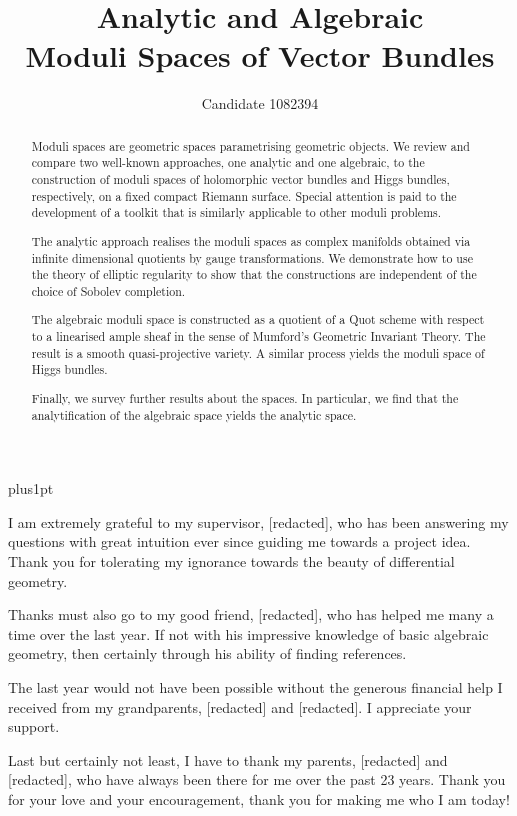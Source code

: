 \documentclass[12pt]{ociamthesis}  %
\title{Analytic and Algebraic\\[1ex]Moduli Spaces of Vector Bundles}   %
\author{Candidate 1082394}             %
\begin{document}
\baselineskip=18pt plus1pt

\setcounter{secnumdepth}{3}
\setcounter{tocdepth}{3}


\maketitle                  %

\begin{acknowledgements}
  I am extremely grateful to my supervisor, [redacted],
  who has been answering my questions with great intuition ever since
  guiding me towards a project idea. Thank you for tolerating my
  ignorance towards the beauty of differential geometry.

  Thanks must also go to my good friend, [redacted], who has
  helped me many a time over the last year. If not with his
  impressive knowledge of basic algebraic geometry, then certainly
  through his ability of finding references.

  The last year would not have been possible without the generous
  financial help I received from my grandparents, [redacted] and
  [redacted].  I appreciate your support.

  Last but certainly not least, I have to thank my parents,
  [redacted] and [redacted], who have always been there for
  me over the past 23 years. Thank you for your love and your
  encouragement, thank you for making me who I am today!
\end{acknowledgements}

\begin{abstract}
  Moduli spaces are geometric spaces parametrising geometric objects.  We review
  and compare two well-known approaches, one analytic and one algebraic, to the
  construction of moduli spaces of holomorphic vector bundles and Higgs bundles,
  respectively, on a fixed compact Riemann surface. Special attention
  is paid to the development of a toolkit that is similarly applicable to
  other moduli problems.

  The analytic approach realises the moduli spaces as complex
  manifolds obtained via infinite dimensional quotients by gauge
  transformations. We demonstrate how to use the theory of elliptic
  regularity to show that the constructions are independent
  of the choice of Sobolev completion.

  The algebraic moduli space is constructed as a quotient of a
  Quot scheme with respect to a linearised ample sheaf in the
  sense of Mumford's Geometric Invariant Theory. The result is a smooth
  quasi-projective variety. A similar process yields the moduli
  space of Higgs bundles.

  Finally, we survey further results about the spaces. In particular,
  we find that the analytification of the algebraic space yields the
  analytic space.
\end{abstract}
\end{document}
